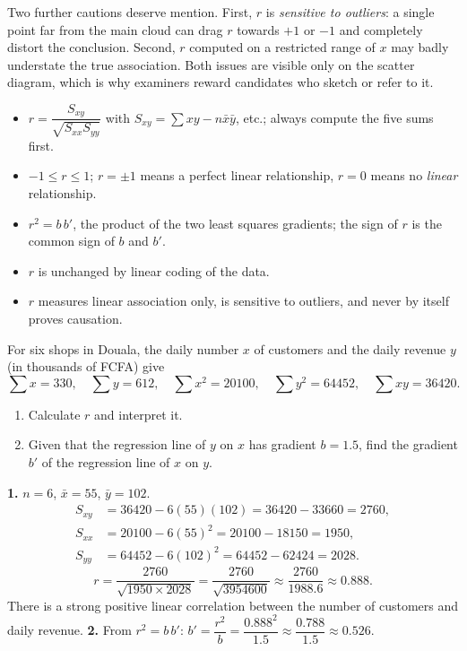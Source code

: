 \documentclass[11pt]{article}
\begin{document}
Two further cautions deserve mention. First, $r$ is \emph{sensitive to outliers}: a single point far from the main cloud can drag $r$ towards $+1$ or $-1$ and completely distort the conclusion. Second, $r$ computed on a restricted range of $x$ may badly understate the true association. Both issues are visible only on the scatter diagram, which is why examiners reward candidates who sketch or refer to it.

\begin{aretenir}
\begin{itemize}
\item $r = \dfrac{S_{xy}}{\sqrt{S_{xx}S_{yy}}}$ with $S_{xy}=\sum xy - n\bar{x}\bar{y}$, etc.; always compute the five sums first.
\item $-1 \le r \le 1$; $r=\pm1$ means a perfect linear relationship, $r=0$ means no \emph{linear} relationship.
\item $r^2 = b\,b'$, the product of the two least squares gradients; the sign of $r$ is the common sign of $b$ and $b'$.
\item $r$ is unchanged by linear coding of the data.
\item $r$ measures linear association only, is sensitive to outliers, and never by itself proves causation.
\end{itemize}
\end{aretenir}

\begin{exercice}
For six shops in Douala, the daily number $x$ of customers and the daily revenue $y$ (in thousands of FCFA) give
\[
\sum x = 330,\quad \sum y = 612,\quad \sum x^2 = 20100,\quad \sum y^2 = 64452,\quad \sum xy = 36420.
\]
\begin{enumerate}
\item Calculate $r$ and interpret it.
\item Given that the regression line of $y$ on $x$ has gradient $b = 1.5$, find the gradient $b'$ of the regression line of $x$ on $y$.
\end{enumerate}
\end{exercice}

\begin{corrige}[Exercise 1]
\textbf{1.} $n=6$, $\bar{x} = 55$, $\bar{y} = 102$.
\begin{align*}
S_{xy} &= 36420 - 6(55)(102) = 36420 - 33660 = 2760,\\
S_{xx} &= 20100 - 6(55)^2 = 20100 - 18150 = 1950,\\
S_{yy} &= 64452 - 6(102)^2 = 64452 - 62424 = 2028.
\end{align*}
\[
r = \frac{2760}{\sqrt{1950 \times 2028}} = \frac{2760}{\sqrt{3954600}} \approx \frac{2760}{1988.6} \approx 0.888.
\]
There is a strong positive linear correlation between the number of customers and daily revenue.
\textbf{2.} From $r^2 = b\,b'$: $b' = \dfrac{r^2}{b} = \dfrac{0.888^2}{1.5} \approx \dfrac{0.788}{1.5} \approx 0.526$.
\end{corrige}
\end{document}

